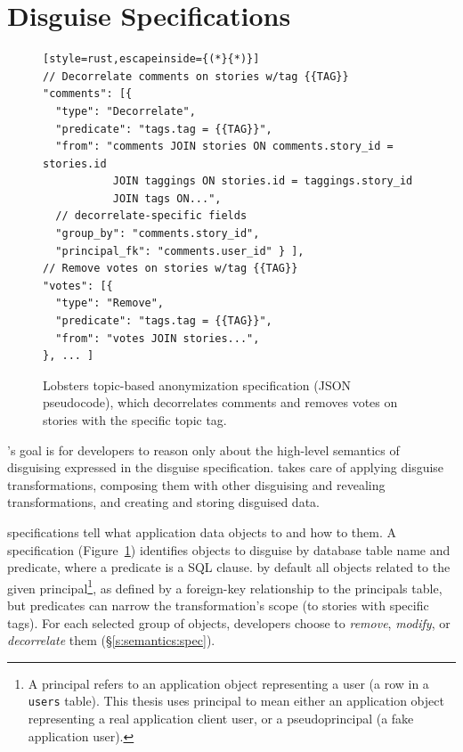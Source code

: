 
\section{Disguise Specifications}
\label{s:spec}

\begin{figure}[t]
\centering
\begin{lstlisting}[style=rust,escapeinside={(*}{*)}]
// Decorrelate comments on stories w/tag {{TAG}}
"comments": [{
  "type": "Decorrelate",
  "predicate": "tags.tag = {{TAG}}",
  "from": "comments JOIN stories ON comments.story_id = stories.id
           JOIN taggings ON stories.id = taggings.story_id
           JOIN tags ON...",
  // decorrelate-specific fields 
  "group_by": "comments.story_id",
  "principal_fk": "comments.user_id" } ],
// Remove votes on stories w/tag {{TAG}}
"votes": [{
  "type": "Remove",
  "predicate": "tags.tag = {{TAG}}",
  "from": "votes JOIN stories...",
}, ... ]
\end{lstlisting}
    \caption[Lobsters topic-based anonymization disguise specification.]{Lobsters topic-based anonymization \xx specification (JSON
    pseudocode), which decorrelates comments and removes votes on stories with
    the specific topic tag.}
\label{f:spec}
\end{figure}


\sys's goal is for developers to reason only about the high-level semantics of
disguising expressed in the disguise specification. \sys takes care of applying
disguise transformations, composing them with other disguising and revealing
transformations, and creating and storing disguised data.


\Xx specifications tell \sys what application data objects to \xx and how to \xx
them.
%
A \xx specification (Figure~\ref{f:spec}) identifies objects to disguise by
database table name and predicate, where a predicate is a SQL  clause.
%
\sys by default \xxs all objects related to the given principal\footnote{A
principal refers to an application object representing a user (\eg a row in a
\texttt{users} table). This thesis uses principal to mean either an 
application object representing a real application client user, or a
pseudoprincipal (a fake application user).}, as
defined by a foreign-key relationship to the principals table, but predicates
can narrow the transformation's scope (\eg to stories with specific tags).
%
For each selected group of objects, developers choose to \emph{remove},
\emph{modify}, or \emph{decorrelate} them (\S\ref{s:semantics:spec}).
%

